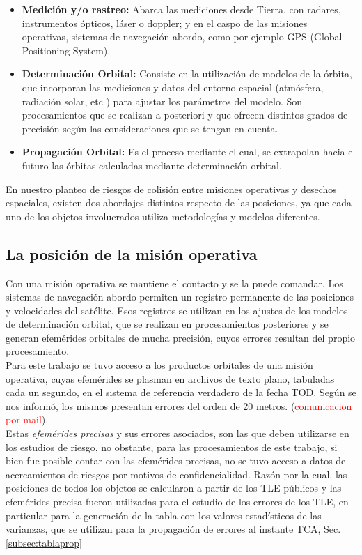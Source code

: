\begin{itemize}
\itemsep0em
 \item {\bf{Medici\'on y/o rastreo:}} Abarca las mediciones desde Tierra, con radares, instrumentos \'opticos, l\'aser o doppler; y en el caspo de las misiones operativas, sistemas de navegaci\'on abordo, como por ejemplo GPS (Global Positioning System).\\
 \item {\bf{Determinaci\'on Orbital:}} Consiste en la utilizaci\'on de modelos de la \'orbita, que incorporan las mediciones y datos del entorno espacial (atm\'osfera, radiaci\'on solar, etc ) para ajustar los par\'ametros del modelo. Son procesamientos que se realizan a posteriori y que ofrecen distintos grados de precisión seg\'un las consideraciones que se tengan en cuenta.\
 \item {\bf{Propagaci\'on Orbital:}} Es el proceso mediante el cual, se extrapolan hacia el futuro las \'orbitas calculadas mediante determinaci\'on orbital.\\
\end{itemize}


En nuestro planteo de riesgos de colisi\'on entre misiones operativas y desechos espaciales, existen dos abordajes distintos respecto de las posiciones, ya que cada uno de los objetos involucrados utiliza metodolog\'ias y modelos diferentes.

\subsection*{La posici\'on de la misi\'on operativa}

Con una misi\'on operativa se mantiene el contacto y se la puede comandar. Los sistemas de navegaci\'on abordo permiten un registro permanente de las posiciones y velocidades del sat\'elite. Esos registros se utilizan en los ajustes de los modelos de determinaci\'on orbital, que se realizan en procesamientos posteriores y se generan efem\'erides orbitales de mucha precisi\'on, cuyos errores resultan del propio procesamiento.\\
Para este trabajo se tuvo acceso a los productos orbitales de una misi\'on operativa, cuyas efem\'erides se plasman en archivos de texto plano, tabuladas cada un segundo, en el sistema de referencia verdadero de la fecha TOD. Seg\'un se nos inform\'o, los mismos presentan errores del orden de  20 metros. (\textcolor{red}{comunicacion por mail}).\\
Estas {\it{efem\'erides precisas}} y sus errores asociados, son las que deben utilizarse en los estudios de riesgo, no obstante, para las procesamientos de este trabajo, si bien fue posible contar con las efem\'erides precisas, no se tuvo acceso a datos de acercamientos de riesgos por motivos de confidencialidad. Raz\'on por la cual, las posiciones de todos los objetos se calcularon a partir de los TLE p\'ublicos y las efem\'erides precisa fueron utilizadas para el estudio de los errores de los TLE, en particular para la generaci\'on de la tabla con los valores estad\'isticos de las varianzas, que se utilizan para la propagaci\'on de errores al instante TCA, Sec. \ref{subsec:tablaprop} \\

